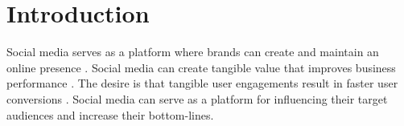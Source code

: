 \documentclass[mksc,blindrev]{informs3} %
\begin{document}
\maketitle

%

  
\section{Introduction}

Social media serves as a platform where brands can create and maintain an online presence \cite{Greenwood2016}. Social media can create tangible value that improves business performance \cite{Authors2013}. The desire is that tangible user engagements result in faster user conversions \cite{Authors2013}. Social media can serve as a platform for influencing their target audiences and increase their bottom-lines.
\end{document}
